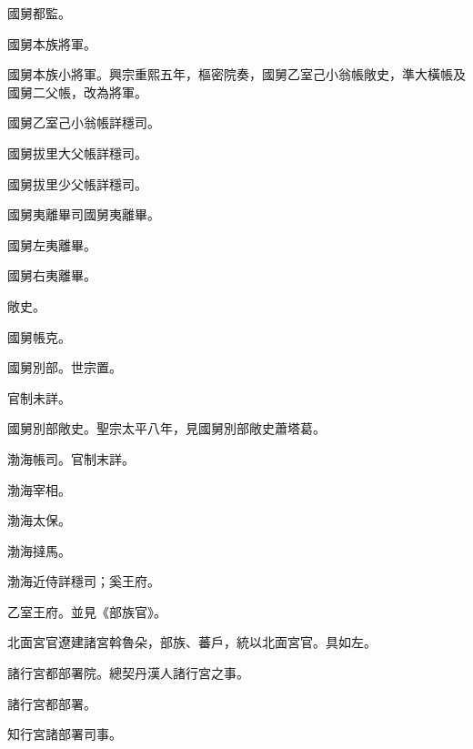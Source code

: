 \begin{pinyinscope}
 國舅都監。



 國舅本族將軍。



 國舅本族小將軍。興宗重熙五年，樞密院奏，國舅乙室己小翁帳敞史，準大橫帳及國舅二父帳，改為將軍。



 國舅乙室己小翁帳詳穩司。



 國舅拔里大父帳詳穩司。



 國舅拔里少父帳詳穩司。



 國舅夷離畢司國舅夷離畢。



 國舅左夷離畢。



 國舅右夷離畢。



 敞史。



 國舅帳克。



 國舅別部。世宗置。



 官制未詳。



 國舅別部敞史。聖宗太平八年，見國舅別部敞史蕭塔葛。



 渤海帳司。官制末詳。



 渤海宰相。



 渤海太保。



 渤海撻馬。



 渤海近侍詳穩司；奚王府。



 乙室王府。並見《部族官》。



 北面宮官遼建諸宮斡魯朵，部族、蕃戶，統以北面宮官。具如左。



 諸行宮都部署院。總契丹漢人諸行宮之事。



 諸行宮都部署。



 知行宮諸部署司事。




\end{pinyinscope}
